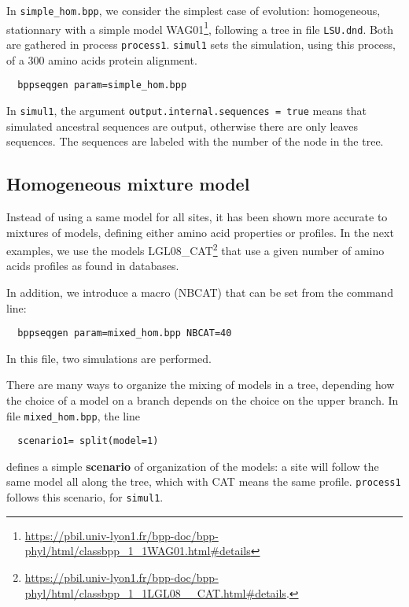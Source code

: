 \documentclass{article}
\begin{document}
In \verb|simple_hom.bpp|, we consider the simplest case of evolution:
homogeneous, stationnary with a simple model
WAG01\footnote{\label{WAG01}\url{https://pbil.univ-lyon1.fr/bpp-doc/bpp-phyl/html/classbpp_1_1WAG01.html#details}},
following a tree in file \texttt{LSU.dnd}. Both are gathered in
process \texttt{process1}. \texttt{simul1} sets the simulation, using
this process, of a 300 amino acids protein alignment.

\begin{verbatim}
  bppseqgen param=simple_hom.bpp
\end{verbatim}

In \texttt{simul1}, the argument \texttt{output.internal.sequences =
  true} means that simulated ancestral sequences are output, otherwise
there are only leaves sequences. The sequences are labeled with the
number of the node in the tree.

\subsection{Homogeneous mixture model}

Instead of using a same model for all sites, it has been shown more
accurate to mixtures of models, defining either amino acid properties
or profiles. In the next examples, we use the models
LGL08\_CAT\footnote{\url{https://pbil.univ-lyon1.fr/bpp-doc/bpp-phyl/html/classbpp_1_1LGL08__CAT.html#details}.}
that use a given number of amino acids profiles as found in databases.

In addition, we introduce a macro (NBCAT) that can be set from the
command line:

\begin{verbatim}
  bppseqgen param=mixed_hom.bpp NBCAT=40
\end{verbatim}

In this file, two simulations are performed. 

There are many ways to organize the mixing of models in a tree,
depending how the choice of a model on a branch depends on the choice
on the upper branch. In file \texttt{mixed\_hom.bpp}, the line

\begin{verbatim}
  scenario1= split(model=1)
\end{verbatim}

defines a simple \textbf{scenario} of organization of the models: a
site will follow the same model all along the tree, which with CAT
means the same profile. \texttt{process1} follows this scenario, for
\texttt{simul1}.
\end{document}
